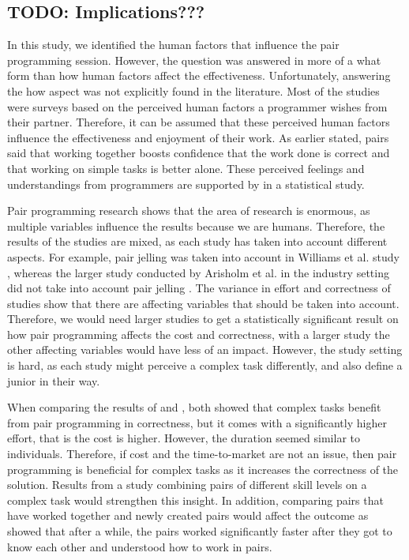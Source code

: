 \documentclass[conference]{IEEEtran}
\newcommand{\todo}[1]{{\color{red} TODO: {#1}}}
\begin{document}
\subsection{\todo{Implications???}}

In this study, we identified the human factors that influence the pair programming session. However, the question was answered in more of a what form than how human factors affect the effectiveness. Unfortunately, answering the how aspect was not explicitly found in the literature. Most of the studies were surveys based on the perceived human factors a programmer wishes from their partner. Therefore, it can be assumed that these perceived human factors influence the effectiveness and enjoyment of their work. As earlier stated, pairs said that working together boosts confidence that the work done is correct and that working on simple tasks is better alone. These perceived feelings and understandings from programmers are supported by  \cite{Arisholm2007Evaluating} in a statistical study. 


Pair programming research shows that the area of research is enormous, as multiple variables influence the results because we are humans. Therefore, the results of the studies are mixed, as each study has taken into account different aspects. For example, pair jelling was taken into account in Williams et al. study \cite{Williams2000Strengthening}, whereas the larger study conducted by Arisholm et al. in the industry setting did not take into account pair jelling \cite{Arisholm2007Evaluating}.  The variance in effort and correctness of studies show that there are affecting variables that should be taken into account. Therefore, we would need larger studies to get a statistically significant result on how pair programming affects the cost and correctness, with a larger study the other affecting variables would have less of an impact. However, the study setting is hard, as each study might perceive a complex task differently, and also define a junior in their way.

When comparing the results of \cite{Arisholm2007Evaluating} and \cite{10.1145/1159733.1159749}, both showed that complex tasks benefit from pair programming in correctness, but it comes with a significantly higher effort, that is the cost is higher. However, the duration seemed similar to individuals. Therefore, if cost and the time-to-market are not an issue, then pair programming is beneficial for complex tasks as it increases the correctness of the solution. Results from a study combining pairs of different skill levels on a complex task would strengthen this insight. In addition, comparing pairs that have worked together and newly created pairs would affect the outcome as \cite{Williams2000Strengthening, 1541842} showed that after a while, the pairs worked significantly faster after they got to know each other and understood how to work in pairs.
\end{document}
